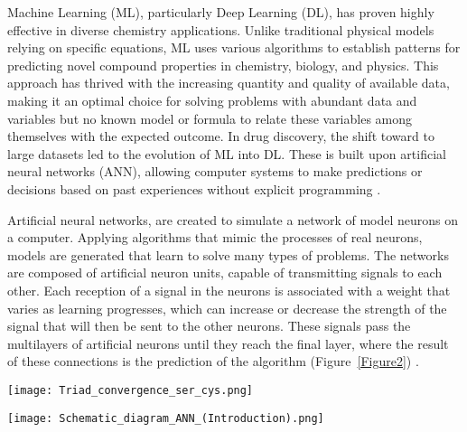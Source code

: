 \documentclass[final,times,twocolumn,article]{elsarticle}
\begin{document}
Machine Learning (ML), particularly Deep Learning (DL), has proven highly effective in diverse chemistry applications. Unlike traditional physical models relying on specific equations, ML uses various algorithms to establish patterns for predicting novel compound properties in chemistry, biology, and physics. This approach has thrived with the increasing quantity and quality of available data, making it an optimal choice for solving problems with abundant data and variables but no known model or formula to relate these variables among themselves with the expected outcome. In drug discovery, the shift toward to large datasets led to the evolution of ML into DL. These is built upon artificial neural networks (ANN), allowing computer systems to make predictions or decisions based on past experiences without explicit programming \cite{Nag2022}.

Artificial neural networks, are created to simulate a network of model neurons on a computer. Applying algorithms that mimic the processes of real neurons, models are generated that learn to solve many types of problems. The networks are composed of artificial neuron units, capable of transmitting signals to each other. Each reception of a signal in the neurons is associated with a weight that varies as learning progresses, which can increase or decrease the strength of the signal that will then be sent to the other neurons. These signals pass the multilayers of artificial neurons until they reach the final layer, where the result of these connections is the prediction of the algorithm (Figure~\ref{Figure2}) \cite{Talevi2020} \cite{Nag2022}.

\begin{figure*}
    \centering 
     \texttt{[image: Triad\_convergence\_ser\_cys.png]}	
     \caption{In the figure, can be observed the organization of catalytic involving systeine and serine residues. It illustrates how these triads interact with the active site of enzimes such as subtilisin, prolyl oligopeptidase, TEV protease and papain. These triads have converged to nearly identical arrangements, driven by the mechanistic similarities between cysteine and serine proteolysis mechanisms.} 
     \label{Figure1}
 \end{figure*}

\begin{figure*}
    \centering 
     \texttt{[image: Schematic\_diagram\_ANN\_(Introduction).png]}	
     \caption{Schematic diagram that illustrates how a single neuron functions within an artificial neural network (ANN). The performance of the ANN depends on factors such as the number of layers it has, the number of neurons, how they communicate with each other, the bias, and the mathematical operations they perform to transform information. The figure shows various input data (i1,i2..) and output data (v1,v2...) which are depicted as small neurons connected to each other.} 
     \label{Figure2}
 \end{figure*}
\end{document}
